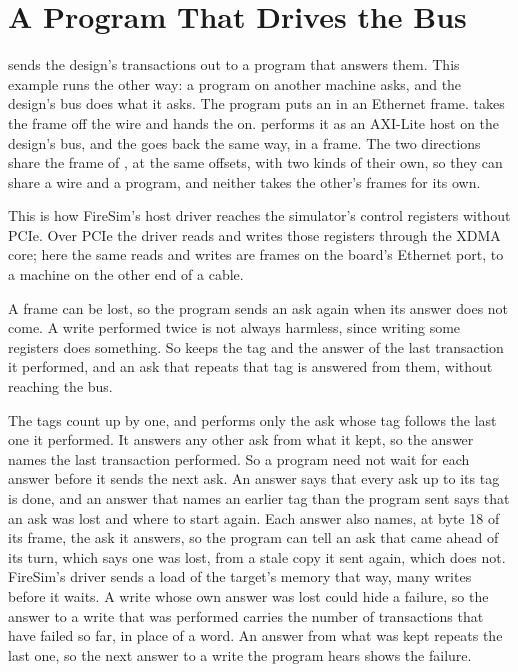 \section{A Program That Drives the Bus}
\label{sec:x-hostlink}

 sends the design's transactions out to a program that
answers them. This example runs the other way: a program on another
machine asks, and the design's bus does what it asks. The program
puts an  in an Ethernet frame.  takes the
frame off the wire and hands the  on. 
performs it as an AXI-Lite host on the design's bus, and the
 goes back the same way, in a frame. The two directions
share the frame of , at the same offsets, with two
kinds of their own, so they can share a wire and a program, and
neither takes the other's frames for its own.

This is how FireSim's host driver reaches the simulator's control
registers without PCIe. Over PCIe the driver reads and writes those
registers through the XDMA core; here the same reads and writes are
frames on the board's Ethernet port, to a machine on the other end of
a cable.

A frame can be lost, so the program sends an ask again when its
answer does not come. A write performed twice is not always harmless,
since writing some registers does something. So 
keeps the tag and the answer of the last transaction it performed,
and an ask that repeats that tag is answered from them, without
reaching the bus.

The tags count up by one, and  performs only the ask
whose tag follows the last one it performed. It answers any other ask
from what it kept, so the answer names the last transaction performed.
So a program need not wait for each answer before it sends the next
ask. An answer says that every ask up to its tag is done, and an
answer that names an earlier tag than the program sent says that an
ask was lost and where to start again. Each answer also names, at
byte 18 of its frame, the ask it answers, so the program can tell an
ask that came ahead of its turn, which says one was lost, from a stale
copy it sent again, which does not. FireSim's driver sends a load of
the target's memory that way, many writes before it waits. A write
whose own answer was lost could hide a failure, so the answer to a
write that was performed carries the number of transactions that have
failed so far, in place of a word. An answer from what was kept repeats
the last one, so the next answer to a write the program hears shows
the failure.

